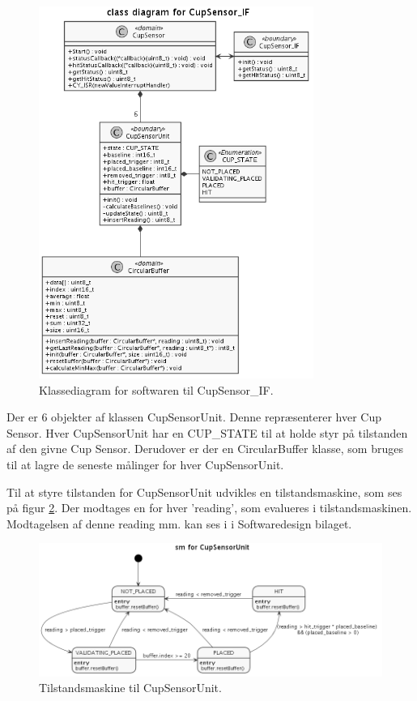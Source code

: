 \documentclass[Rapport/Rapport_main.tex]{subfiles}
\begin{document}
\begin{figure}[H]
    \centering
    \includegraphics[width=0.8\textwidth]{Softwaredesign/CupSensor_IF/graphics/classDiagram.png}
    \caption{Klassediagram for softwaren til CupSensor\_IF.}
    \label{fig:CupSensor-IF-classDiagram}
\end{figure}

Der er 6 objekter af klassen CupSensorUnit. Denne repræsenterer hver Cup Sensor. Hver CupSensorUnit har en CUP\_STATE til at holde styr på tilstanden af den givne Cup Sensor. Derudover er der en CircularBuffer klasse, som bruges til at lagre de seneste målinger for hver CupSensorUnit.

Til at styre tilstanden for CupSensorUnit udvikles en tilstandsmaskine, som ses på figur \ref{fig:CupSensor-IF-state}. Der modtages en for hver 'reading', som evalueres i tilstandsmaskinen. Modtagelsen af denne reading mm. kan ses i  i Softwaredesign bilaget.

\begin{figure}[H]
    \centering
    \includegraphics[width=1\textwidth]{Softwaredesign/CupSensor_IF/graphics/state.png}
    \caption{Tilstandsmaskine til CupSensorUnit.}
    \label{fig:CupSensor-IF-state}
\end{figure}
\end{document}
